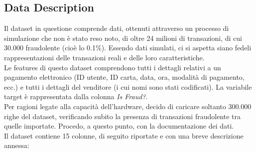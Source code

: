 \documentclass[]{article}
\begin{document}
    \subsection{Data Description}
        Il dataset in questione comprende dati, ottenuti attraverso un processo di simulazione che non è stato reso noto, di oltre 24 milioni di transazioni, di cui 30.000 fraudolente (cioè lo 0.1\%). Essendo dati simulati, ci si aspetta siano fedeli rappresentazioni delle transazioni reali e delle loro caratteristiche.\\
        Le features di questo dataset comprendono tutti i dettagli relativi a un pagamento elettronico (ID utente, ID carta, data, ora, modalità di pagamento, ecc.) e tutti i dettagli del venditore (i cui nomi sono stati codificati). La variabile target è rappresentata dalla colonna \textit{Is Fraud?}.\\
        Per ragioni legate alla capacità dell'hardware, decido di caricare soltanto 300.000 righe del dataset, verificando subito la presenza di transazioni fraudolente tra quelle importate.
        Procedo, a questo punto, con la documentazione dei dati.\\
        Il dataset contiene 15 colonne, di seguito riportate e con una breve descrizione annessa:
\end{document}
